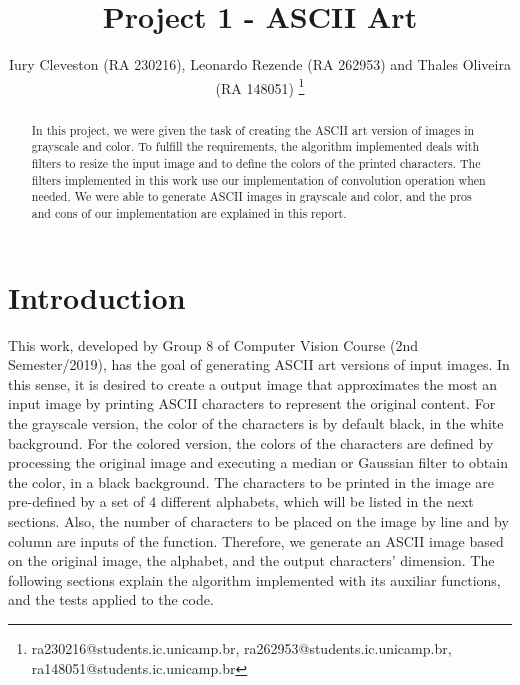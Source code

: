 \documentclass[]{IEEEtran}
\begin{document}
  \title{Project 1 - ASCII Art}
  \author{Iury Cleveston (RA 230216), Leonardo Rezende (RA 262953) and Thales Oliveira (RA 148051)
    \thanks{ra230216@students.ic.unicamp.br, ra262953@students.ic.unicamp.br, ra148051@students.ic.unicamp.br}
  }
  \maketitle
  
  \begin{abstract}
    In this project, we were given the task of creating the ASCII art version of images in grayscale and color. To fulfill the requirements, the algorithm implemented deals with filters to resize the input image and to define the colors of the printed characters. The filters implemented in this work use our implementation of convolution operation when needed. We were able to generate ASCII images in grayscale and color, and the pros and cons of our implementation are explained in this report.
  \end{abstract}
  
\section{Introduction}
This work, developed by Group 8 of Computer Vision Course (2nd Semester/2019), has the goal of generating ASCII art versions of input images. In this sense, it is desired to create a output image that approximates the most an input image by printing ASCII characters to represent the original content. For the grayscale version, the color of the characters is by default black, in the white background. For the colored version, the colors of the characters are defined by processing the original image and executing a median or Gaussian filter to obtain the color, in a black background. The characters to be printed in the image are pre-defined by a set of 4 different alphabets, which will be listed in the next sections. Also, the number of characters to be placed on the image by line and by column are inputs of the function. Therefore, we generate an ASCII image based on the original image, the alphabet, and the output characters' dimension. The following sections explain the algorithm implemented with its auxiliar functions, and the tests applied to the code.  
\end{document}

